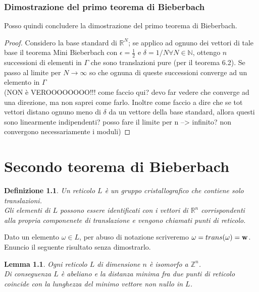\documentclass[10pt,a4paper]{book}
\newtheorem{definition}{Definizione}[section]
\newtheorem{lemma}[theorem]{Lemma}
\begin{document}
\subsection{Dimostrazione del primo teorema di Bieberbach}

Posso quindi concludere la dimostrazione del primo teorema di Bieberbach.

\begin{proof}
Considero la base standard di $\mathbb{R}^N$; se applico ad ognuno dei vettori di tale base il teorema Mini Bieberbach con $\epsilon = \frac{1}{2}$ e $\delta = 1/N \forall N \in \mathbb{N}$, ottengo $n$ successioni di elementi in $\Gamma$ che sono translazioni pure (per il teorema 6.2). 
Se passo al limite per $N \longrightarrow \infty$ so che ognuna di queste successioni converge ad un elemento in $\Gamma$ \\
 (NON è VEROOOOOOOO!!! come faccio qui? devo far vedere che converge ad una direzione, ma non saprei come farlo. Inoltre come faccio a dire che se tot vettori distano ognuno meno di $\delta $ da un vettore della base standard, allora questi sono linearmente indipendenti? posso fare il limite per n --> infinito? non convergono necessariamente i moduli)
\end{proof}

\chapter{Secondo teorema di Bieberbach}

\begin{definition}
Un reticolo $L$ è un gruppo cristallografico che contiene solo translazioni. \\
Gli elementi di $L$ possono essere identificati con i vettori di $\mathbb{R}^n$ corrispondenti alla propria componenete di translazione e vengono chiamati punti di reticolo. 
\end{definition}

Dato un elemento $\omega \in L$, per abuso di notazione scriveremo $\omega = trans(\omega) = \vb{w}$. 
Enuncio il seguente risultato senza dimostrarlo.
\begin{lemma}
Ogni reticolo $L$ di dimensione $n$ è isomorfo a $\mathbb{Z}^n$. \\
Di conseguenza $L$ è abeliano e la distanza minima fra due punti di reticolo coincide con la lunghezza del minimo vettore non nullo in $L$.  
\end{lemma}
\end{document}
